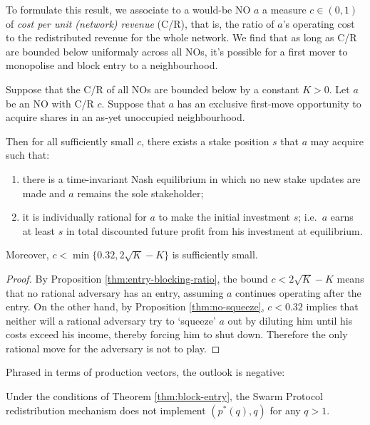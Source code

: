 To formulate this result, we associate to a would-be NO $a$ a measure $c\in(0,1)$ of \emph{cost per unit (network) revenue} (C/R), that is, the ratio of $a$'s operating cost to the redistributed revenue for the whole network.
%
We find that as long as C/R are bounded below uniformaly across all NOs, it's possible for a first mover to monopolise and block entry to a neighbourhood.

\begin{theorem}
  \label{thm:block-entry}

  Suppose that the C/R of all NOs are bounded below by a constant $K>0$.
  Let $a$ be an NO with C/R $c$. 
  Suppose that $a$ has an exclusive first-move opportunity to acquire shares in an as-yet unoccupied neighbourhood.
  
  Then for all sufficiently small $c$, there exists a stake position $s$ that $a$ may acquire such that:
  \begin{enumerate}
    \item there is a time-invariant Nash equilibrium in which no new stake updates are made and $a$ remains the sole stakeholder;
    \item it is individually rational for $a$ to make the initial investment $s$; i.e.~$a$ earns at least $s$ in total discounted future profit from his investment at equilibrium.
  \end{enumerate}
  Moreover, $c < \min\{0.32, 2\sqrt{K}-K\}$ is sufficiently small.

\end{theorem}
%
\begin{proof}

  By Proposition \ref{thm:entry-blocking-ratio}, the bound $c<2\sqrt{K}-K$ means that no rational adversary has an entry, assuming $a$ continues operating after the entry.
  On the other hand, by Proposition \ref{thm:no-squeeze}, $c<0.32$ implies that neither will a rational adversary try to `squeeze' $a$ out by diluting him until his costs exceed his income, thereby forcing him to shut down.
  Therefore the only rational move for the adversary is not to play. \qedhere

\end{proof}

Phrased in terms of production vectors, the outlook is negative:

\begin{corollary}

  Under the conditions of Theorem \ref{thm:block-entry}, the Swarm Protocol redistribution mechanism does not implement $(p^*(q),q)$ for any $q>1$.

\end{corollary}


